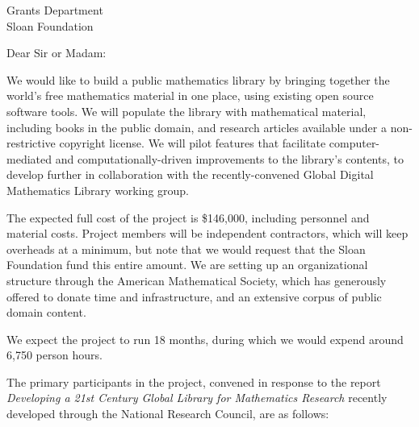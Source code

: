 \documentclass{letter}
\begin{document}
\signature{Volker Sorge\\ \emph{for the GDML Consortium}}
\address{Volker Sorge\\
School of Computer Science\\
University of Birmingham\\
B15 2TT, UK}
\begin{letter}{Grants Department \\ Sloan Foundation}
\opening{Dear Sir or Madam:}


We would like to build a public mathematics library by bringing
together the world's free mathematics material in one place, using
existing open source software tools.
%
We will populate the library with mathematical material, including
books in the public domain, and research articles available under a
non-restrictive copyright license.
%
We will pilot features that facilitate computer-mediated and
computationally-driven improvements to the library's contents, to
develop further in collaboration with the recently-convened Global
Digital Mathematics Library working group.


The expected full cost of the project is \$146,000, including
personnel and material costs.  Project members will be independent
contractors, which will keep overheads at a minimum, but note that we
would request that the Sloan Foundation fund this entire amount.  We
are setting up an organizational structure through the American
Mathematical Society, which has generously offered to donate time and
infrastructure, and an extensive corpus of public domain content.

We expect the project to run 18 months, during which we would expend
around 6,750 person hours.

The primary participants in the project, convened in response to the report \emph{Developing a 21st Century Global Library for Mathematics Research} recently developed through the National Research Council, are as follows:


\end{letter}
\end{document}
